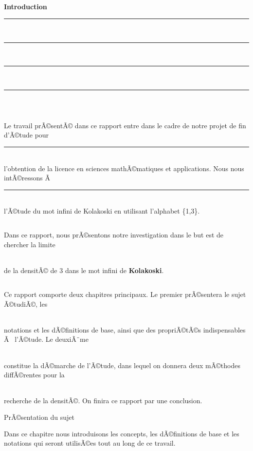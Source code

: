 \documentclass[12pt,a4paper,oneside]{book}
\begin{document}
\begin{titlepage}
\chapter*{}      
      \begin{center}
            {\Huge \textbf{Introduction}}
      \end{center}
\rule{1\textwidth}{0pt} \\\rule{1\textwidth}{0pt} \\\rule{1\textwidth}{0pt} \\\rule{1\textwidth}{0pt} \\
\section*{}
\par Le travail prÃ©sentÃ© dans ce rapport entre dans le cadre de notre projet de fin d'Ã©tude pour \\ \rule{1\textwidth}{0pt} \\ l'obtention de la licence en sciences mathÃ©matiques et applications. Nous nous intÃ©ressons Ã  \\ \rule{1\textwidth}{0pt} \\ l'Ã©tude du mot infini de Kolakoski en utilisant l'alphabet \{1,3\}.
\section*{}
\par Dans ce rapport, nous prÃ©sentons notre investigation dans le but est de chercher la limite  \\ \rule{0,3\textwidth}{0pt} \\ de la densitÃ© de 3 dans le mot infini de \textbf{Kolakoski}.
\section*{}
\par Ce rapport comporte deux chapitres principaux. Le premier prÃ©sentera le sujet Ã©tudiÃ©, les \\ \rule{0,3\textwidth}{0pt} \\ notations et les dÃ©finitions de base, ainsi que des propriÃ©tÃ©s indispensables Ã  l'Ã©tude. Le deuxiÃ¨me \\ \rule{0,3\textwidth}{0pt} \\constitue la dÃ©marche de l'Ã©tude, dans lequel on donnera deux mÃ©thodes diffÃ©rentes pour la  \\ \rule{0,3\textwidth}{0pt} \\ recherche de la densitÃ©. On finira ce rapport par une conclusion.
\begin{chapter}{PrÃ©sentation du sujet}
\par Dans ce chapitre nous introduisons les concepts, les dÃ©finitions de base et les notations qui seront utilisÃ©es tout au long de ce travail.

\end{chapter}
\end{titlepage}
\end{document}
